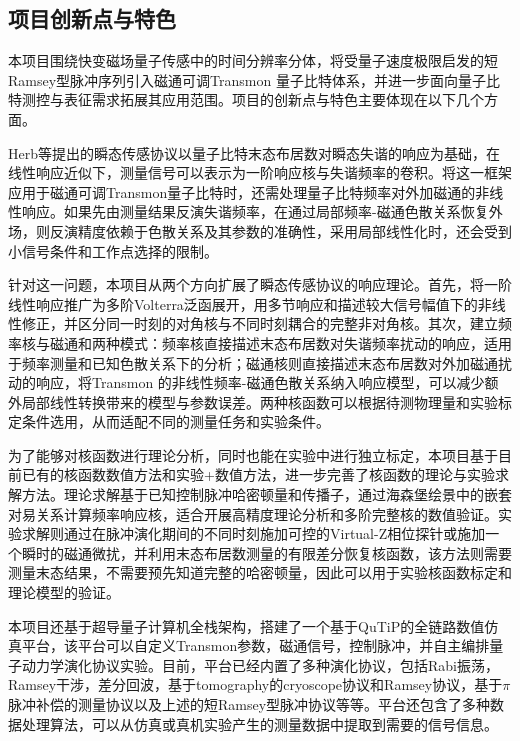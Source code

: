 \documentclass[a4paper,12pt]{article}
\begin{document}
\subsection{项目创新点与特色}
本项目围绕快变磁场量子传感中的时间分辨率分体，将受量子速度极限启发的短Ramsey型脉冲序列引入磁通可调Transmon 量子比特体系，并进一步面向量子比特测控与表征需求拓展其应用范围。项目的创新点与特色主要体现在以下几个方面。
\vspace{1em}
\par Herb等提出的瞬态传感协议以量子比特末态布居数对瞬态失谐的响应为基础，在线性响应近似下，测量信号可以表示为一阶响应核与失谐频率的卷积\citet{herb2024quantum}。将这一框架应用于磁通可调Transmon量子比特时，还需处理量子比特频率对外加磁通的非线性响应。如果先由测量结果反演失谐频率，在通过局部频率-磁通色散关系恢复外场，则反演精度依赖于色散关系及其参数的准确性，采用局部线性化时，还会受到小信号条件和工作点选择的限制。

\par 针对这一问题，本项目从两个方向扩展了瞬态传感协议的响应理论。首先，将一阶线性响应推广为多阶Volterra泛函展开，用多节响应和描述较大信号幅值下的非线性修正，并区分同一时刻的对角核与不同时刻耦合的完整非对角核。其次，建立频率核与磁通和两种模式：频率核直接描述末态布居数对失谐频率扰动的响应，适用于频率测量和已知色散关系下的分析；磁通核则直接描述末态布居数对外加磁通扰动的响应，将Transmon 的非线性频率-磁通色散关系纳入响应模型，可以减少额外局部线性转换带来的模型与参数误差。两种核函数可以根据待测物理量和实验标定条件选用，从而适配不同的测量任务和实验条件。
\vspace{3em}
\par 为了能够对核函数进行理论分析，同时也能在实验中进行独立标定，本项目基于目前已有的核函数数值方法\citet{lin2025application}和实验+数值方法\citet{herb2025magnetometry}，进一步完善了核函数的理论与实验求解方法。理论求解基于已知控制脉冲哈密顿量和传播子，通过海森堡绘景中的嵌套对易关系计算频率响应核，适合开展高精度理论分析和多阶完整核的数值验证。实验求解则通过在脉冲演化期间的不同时刻施加可控的Virtual-Z相位探针或施加一个瞬时的磁通微扰，并利用末态布居数测量的有限差分恢复核函数，该方法则需要测量末态结果，不需要预先知道完整的哈密顿量，因此可以用于实验核函数标定和理论模型的验证。
\vspace{1em}
\par 本项目还基于超导量子计算机全栈架构，搭建了一个基于QuTiP的全链路数值仿真平台，该平台可以自定义Transmon参数，磁通信号，控制脉冲，并自主编排量子动力学演化协议实验。目前，平台已经内置了多种演化协议，包括Rabi振荡，Ramsey干涉，差分回波，基于tomography的cryoscope协议和Ramsey协议，基于$\pi$脉冲补偿的测量协议以及上述的短Ramsey型脉冲协议等等。平台还包含了多种数据处理算法，可以从仿真或真机实验产生的测量数据中提取到需要的信号信息。
\end{document}
